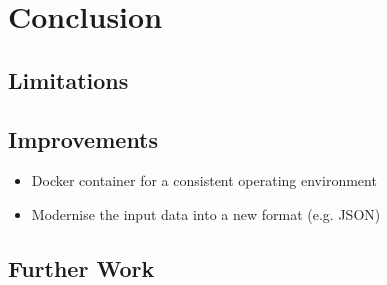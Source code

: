 \documentclass[conference]{IEEEtran}
\begin{document}

\section{Conclusion}\label{conclusion}

\subsection{Limitations}

\subsection{Improvements}

\begin{itemize}
    \item Docker container for a consistent operating environment
    \item Modernise the input data into a new format (e.g. JSON)
\end{itemize}

\subsection{Further Work}




\end{document}
